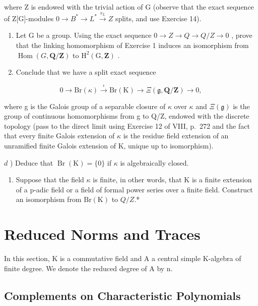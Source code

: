 where Z is endowed with the trivial action of G (observe that the exact sequence of Z{[}G{]}-modules \(0 \rightarrow B^{*} \rightarrow L^{*} \xrightarrow{v_{L}} Z\) splits, and use Exercise 14).

\begin{enumerate}
\def\labelenumi{\alph{enumi})}
\setcounter{enumi}{1}
\item
  Let G be a group. Using the exact sequence \(0 \rightarrow Z \rightarrow Q \rightarrow Q/Z \rightarrow 0\) , prove that the linking homomorphism of Exercise 1 induces an isomorphism from \(\operatorname{Hom}(G, \mathbf{Q}/\mathbf{Z})\) to \(\mathrm{H}^{2}(\mathrm{G}, \mathbf{Z})\) .
\item
  Conclude that we have a split exact sequence
\end{enumerate}

\[
0 \to \mathrm{Br} (\kappa) \stackrel {\iota} {\to} \mathrm{Br} (\mathrm{K}) \to \Xi (\mathfrak {g}, \mathbf {Q} / \mathbf {Z}) \to 0,
\]

where g is the Galois group of a separable closure of \(\kappa\) over \(\kappa\) and \(\Xi(\mathfrak{g})\) is the group of continuous homomorphisms from g to Q/Z, endowed with the discrete topology (pass to the direct limit using Exercise 12 of VIII, p.~272 and the fact that every finite Galois extension of \(\kappa\) is the residue field extension of an unramified finite Galois extension of K, unique up to isomorphism).

\(d\) ) Deduce that \(\operatorname {Br}(\mathrm{K}) = \{0\}\) if \(\kappa\) is algebraically closed.

\begin{enumerate}
\def\labelenumi{\alph{enumi})}
\setcounter{enumi}{4}
\tightlist
\item
  Suppose that the field \(\kappa\) is finite, in other words, that K is a finite extension of a p-adic field or a field of formal power series over a finite field. Construct an isomorphism from \(\mathrm{Br}(\mathrm{K})\) to \(Q/Z\).*
\end{enumerate}

\section{Reduced Norms and Traces}

In this section, K is a commutative field and A a central simple K-algebra of finite degree. We denote the reduced degree of A by n.

\subsection{Complements on Characteristic Polynomials}

